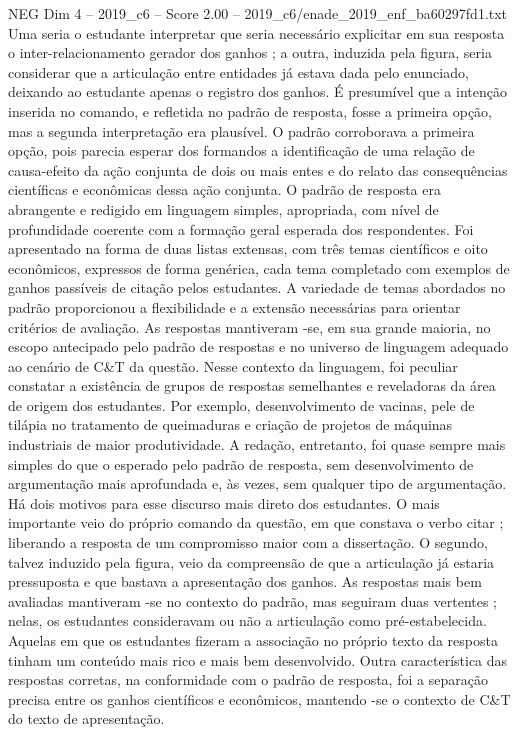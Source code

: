 \begin{textsample}{NEG Dim 4 – 2019\_c6 – Score 2.00 – 2019\_c6/enade\_2019\_enf\_ba60297fd1.txt}
Uma seria o estudante interpretar que seria necessário explicitar em sua resposta o inter-relacionamento gerador dos ganhos ; a outra, induzida pela figura, seria considerar que a articulação entre entidades já estava dada pelo enunciado, deixando ao estudante apenas o registro dos ganhos.
É presumível que a intenção inserida no comando, e refletida no padrão de resposta, fosse a primeira opção, mas a segunda interpretação era plausível.
O padrão corroborava a primeira opção, pois parecia esperar dos formandos a identificação de uma relação de causa-efeito da ação conjunta de dois ou mais entes e do relato das consequências científicas e econômicas dessa ação conjunta.
O padrão de resposta era abrangente e redigido em linguagem simples, apropriada, com nível de profundidade coerente com a formação geral esperada dos respondentes.
Foi apresentado na forma de duas listas extensas, com três temas científicos e oito econômicos, expressos de forma genérica, cada tema completado com exemplos de ganhos passíveis de citação pelos estudantes.
A variedade de temas abordados no padrão proporcionou a flexibilidade e a extensão necessárias para orientar critérios de avaliação.
As respostas mantiveram -se, em sua grande maioria, no escopo antecipado pelo padrão de respostas e no universo de linguagem adequado ao cenário de C\&T da questão.
Nesse contexto da linguagem, foi peculiar constatar a existência de grupos de respostas semelhantes e reveladoras da área de origem dos estudantes.
Por exemplo, desenvolvimento de vacinas, pele de tilápia no tratamento de queimaduras e criação de projetos de máquinas industriais de maior produtividade.
A redação, entretanto, foi quase sempre mais simples do que o esperado pelo padrão de resposta, sem desenvolvimento de argumentação mais aprofundada e, às vezes, sem qualquer tipo de argumentação.
Há dois motivos para esse discurso mais direto dos estudantes.
O mais importante veio do próprio comando da questão, em que constava o verbo citar ; liberando a resposta de um compromisso maior com a dissertação.
O segundo, talvez induzido pela figura, veio da compreensão de que a articulação já estaria pressuposta e que bastava a apresentação dos ganhos.
As respostas mais bem avaliadas mantiveram -se no contexto do padrão, mas seguiram duas vertentes ; nelas, os estudantes consideravam ou não a articulação como pré-estabelecida.
Aquelas em que os estudantes fizeram a associação no próprio texto da resposta tinham um conteúdo mais rico e mais bem desenvolvido.
Outra característica das respostas corretas, na conformidade com o padrão de resposta, foi a separação precisa entre os ganhos científicos e econômicos, mantendo -se o contexto de C\&T do texto de apresentação.

\end{textsample}
